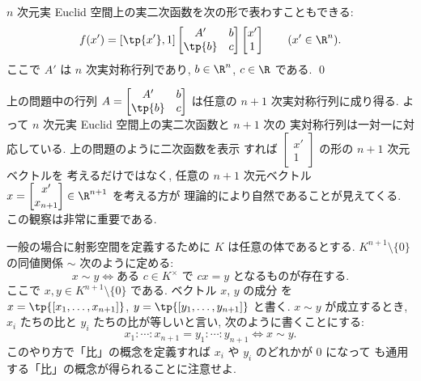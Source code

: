 \documentclass[12pt,twoside]{jarticle}
\begin{document}
\begin{question}
\label{q:quad-func-on-cell}
  $n$ 次元実 Euclid 空間上の実二次函数を次の形で表わすこともできる:
  \begin{equation*}
    f(x') = 
    [\tp{x'},1]
    \begin{bmatrix}
        A'   & b \\
      \tp{b} & c \\
    \end{bmatrix}
    \begin{bmatrix}
      x' \\
      1 \\
    \end{bmatrix}
    \qquad (x'\in\R^n).
  \end{equation*}
  ここで $A'$ は $n$ 次実対称行列であり, $b\in\R^n$, $c\in\R$ である.
  \qed
\end{question}

上の問題中の行列 $A =
\begin{bmatrix}
    A'   & b \\
  \tp{b} & c \\
\end{bmatrix}$ は任意の $n+1$ 次実対称行列に成り得る.  
よって $n$ 次元実 Euclid 空間上の実二次函数と $n+1$ 次の
実対称行列は一対一に対応している.  
上の問題のように二次函数を表示
すれば $\begin{bmatrix} x' \\ 1 \end{bmatrix}$ の形の $n+1$ 次元ベクトルを
考えるだけではなく, 任意の $n+1$ 次元ベクトル $x =
\begin{bmatrix} x' \\ x_{n+1} \end{bmatrix}\in\R^{n+1}$ を考える方が
理論的により自然であることが見えてくる.  この観察は非常に重要である.

\bigskip

一般の場合に射影空間を定義するために $K$ は任意の体であるとする. 
$K^{n+1}\setminus\{0\}$ の同値関係 $\sim$ 次のように定める:
\begin{equation*}
  x \sim y \iff \text{ある $c\in K^\times$ で $cx=y$ となるものが存在する.}
\end{equation*}
ここで $x,y\in K^{n+1}\setminus\{0\}$ である.  
ベクトル $x$, $y$ の成分
を $x=\tp{[x_1,\dots,x_{n+1}]}$, $y=\tp{[y_1,\dots,y_{n+1}]}$ と書く.
$x\sim y$ が成立するとき, $x_i$ たちの比と $y_i$ たちの比が等しいと言い,
次のように書くことにする:
\begin{equation*}
  x_1:\cdots:x_{n+1} = y_1:\cdots:y_{n+1}
  \iff x \sim y.
\end{equation*}
このやり方で「比」の概念を定義すれば $x_i$ や $y_i$ のどれかが $0$ になって
も通用する「比」の概念が得られることに注意せよ.
\end{document}
